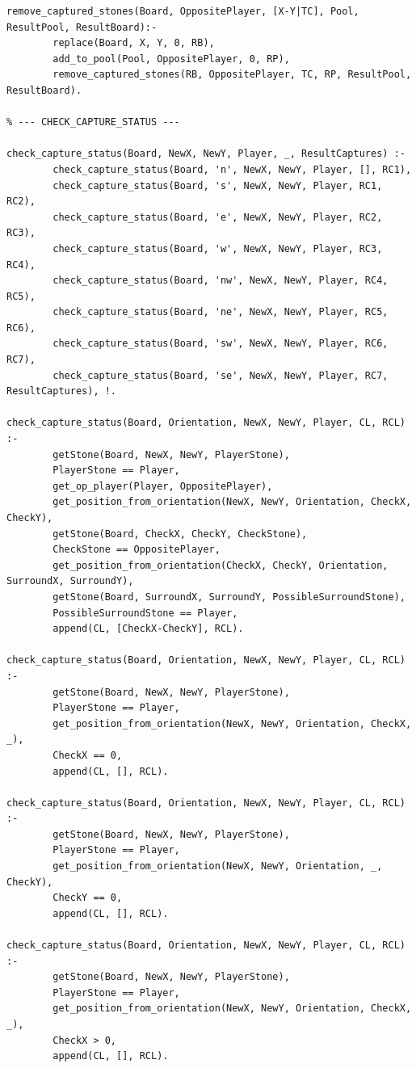 \documentclass[a4paper]{article}
\begin{document}
\begin{lstlisting}
remove_captured_stones(Board, OppositePlayer, [X-Y|TC], Pool, ResultPool, ResultBoard):-
        replace(Board, X, Y, 0, RB),
        add_to_pool(Pool, OppositePlayer, 0, RP),
        remove_captured_stones(RB, OppositePlayer, TC, RP, ResultPool, ResultBoard).

% --- CHECK_CAPTURE_STATUS ---

check_capture_status(Board, NewX, NewY, Player, _, ResultCaptures) :- 
        check_capture_status(Board, 'n', NewX, NewY, Player, [], RC1),
        check_capture_status(Board, 's', NewX, NewY, Player, RC1, RC2),
        check_capture_status(Board, 'e', NewX, NewY, Player, RC2, RC3),
        check_capture_status(Board, 'w', NewX, NewY, Player, RC3, RC4),
        check_capture_status(Board, 'nw', NewX, NewY, Player, RC4, RC5),
        check_capture_status(Board, 'ne', NewX, NewY, Player, RC5, RC6),
        check_capture_status(Board, 'sw', NewX, NewY, Player, RC6, RC7),
        check_capture_status(Board, 'se', NewX, NewY, Player, RC7, ResultCaptures), !.

check_capture_status(Board, Orientation, NewX, NewY, Player, CL, RCL) :- 
        getStone(Board, NewX, NewY, PlayerStone),
        PlayerStone == Player,
        get_op_player(Player, OppositePlayer),
        get_position_from_orientation(NewX, NewY, Orientation, CheckX, CheckY),
        getStone(Board, CheckX, CheckY, CheckStone),
        CheckStone == OppositePlayer,
        get_position_from_orientation(CheckX, CheckY, Orientation, SurroundX, SurroundY),
        getStone(Board, SurroundX, SurroundY, PossibleSurroundStone),
        PossibleSurroundStone == Player,
        append(CL, [CheckX-CheckY], RCL).

check_capture_status(Board, Orientation, NewX, NewY, Player, CL, RCL) :- 
        getStone(Board, NewX, NewY, PlayerStone),
        PlayerStone == Player,
        get_position_from_orientation(NewX, NewY, Orientation, CheckX, _),
        CheckX == 0,
        append(CL, [], RCL).
   
check_capture_status(Board, Orientation, NewX, NewY, Player, CL, RCL) :- 
        getStone(Board, NewX, NewY, PlayerStone),
        PlayerStone == Player,
        get_position_from_orientation(NewX, NewY, Orientation, _, CheckY),
        CheckY == 0,
        append(CL, [], RCL).

check_capture_status(Board, Orientation, NewX, NewY, Player, CL, RCL) :- 
        getStone(Board, NewX, NewY, PlayerStone),
        PlayerStone == Player,
        get_position_from_orientation(NewX, NewY, Orientation, CheckX, _),
        CheckX > 0,
        append(CL, [], RCL).


\end{lstlisting}
\end{document}
